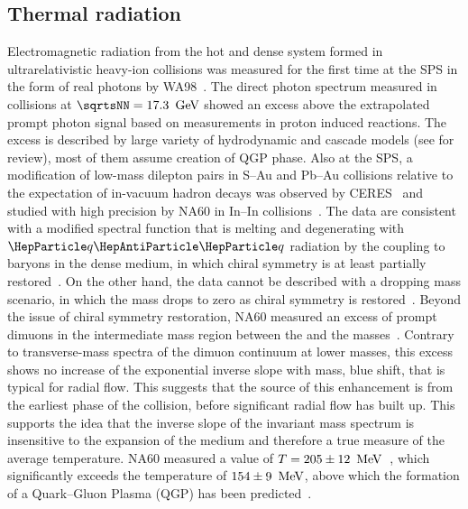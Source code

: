 \documentclass[../report.tex]{subfiles}
\begin{document}
\subsection{Thermal radiation}
\label{sec:thermalradiation}

Electromagnetic radiation from the hot and dense system formed in ultrarelativistic heavy-ion collisions was measured for the first time at the SPS in the form of real photons by WA98~\cite{Aggarwal:2000th}. The direct photon spectrum measured in \PbPb{} collisions at $\sqrtsNN = \unit[17.3]{\UGeV}$ showed an excess above the extrapolated prompt photon signal based on measurements in proton induced reactions. 
The excess is described by large variety of hydrodynamic and cascade models (see \cite{Peitzmann:2001mz} for review), most of them assume creation of QGP phase.
Also at the SPS, a modification of low-mass dilepton pairs in S--Au and Pb--Au collisions relative to the expectation of in-vacuum hadron decays was observed by CERES~\cite{Agakishiev:1995xb,Agakishiev:1997au,Adamova:2002kf,Agakichiev:2005ai,Adamova:2006nu} and studied with high precision by NA60 in In--In collisions~\cite{Arnaldi:2006jq,Arnaldi:2007ru,Arnaldi:2008fw,Specht:2010xu}. The data are consistent with a modified \PGr spectral function that is melting and degenerating with $\PQq\PAQq$ radiation by the coupling to baryons in the dense medium, in which chiral symmetry is at least partially restored~\cite{Rapp:1995zy,Rapp:1999us,Rapp:2009yu,Bazavov:2011nk,Hohler:2013eba}. On the other hand, the data cannot be described with a dropping mass scenario, in which the \PGr mass drops to zero as chiral symmetry is restored~\cite{Brown:1991kk}. Beyond the issue of chiral symmetry restoration, NA60 measured an excess of prompt dimuons in the intermediate mass region between the \PGf and the \PJGy masses~\cite{Arnaldi:2007ru,Arnaldi:2008fw}. Contrary to transverse-mass spectra of the dimuon continuum at lower masses, this excess shows no increase of the exponential inverse slope with mass, \ie blue shift, that is typical for radial flow. This suggests that the source of this enhancement is from the earliest phase of the collision, before significant radial flow has built up. 
This supports the idea that the inverse slope of the invariant mass spectrum is insensitive to the expansion of the medium and therefore a true measure of the average temperature. NA60 measured a value of $T=\unit[205\pm12]{\UMeV}$~\cite{Specht:2010xu}, which significantly exceeds the temperature of $\unit[154\pm9]{\UMeV}$, above which the formation of a Quark--Gluon Plasma (QGP) has been predicted~\cite{Borsanyi:2010bp,Bazavov:2014pvz}.
\end{document}
